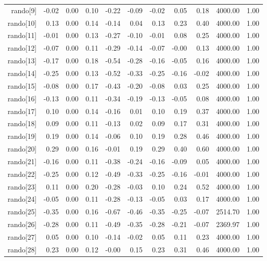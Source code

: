 \begin{table}[ht]
\begin{tabular}{rrrrrrrrrrr}
  rando[9] & -0.02 & 0.00 & 0.10 & -0.22 & -0.09 & -0.02 & 0.05 & 0.18 & 4000.00 & 1.00 \\ 
  rando[10] & 0.13 & 0.00 & 0.14 & -0.14 & 0.04 & 0.13 & 0.23 & 0.40 & 4000.00 & 1.00 \\ 
  rando[11] & -0.01 & 0.00 & 0.13 & -0.27 & -0.10 & -0.01 & 0.08 & 0.25 & 4000.00 & 1.00 \\ 
  rando[12] & -0.07 & 0.00 & 0.11 & -0.29 & -0.14 & -0.07 & -0.00 & 0.13 & 4000.00 & 1.00 \\ 
  rando[13] & -0.17 & 0.00 & 0.18 & -0.54 & -0.28 & -0.16 & -0.05 & 0.16 & 4000.00 & 1.00 \\ 
  rando[14] & -0.25 & 0.00 & 0.13 & -0.52 & -0.33 & -0.25 & -0.16 & -0.02 & 4000.00 & 1.00 \\ 
  rando[15] & -0.08 & 0.00 & 0.17 & -0.43 & -0.20 & -0.08 & 0.03 & 0.25 & 4000.00 & 1.00 \\ 
  rando[16] & -0.13 & 0.00 & 0.11 & -0.34 & -0.19 & -0.13 & -0.05 & 0.08 & 4000.00 & 1.00 \\ 
  rando[17] & 0.10 & 0.00 & 0.14 & -0.16 & 0.01 & 0.10 & 0.19 & 0.37 & 4000.00 & 1.00 \\ 
  rando[18] & 0.09 & 0.00 & 0.11 & -0.13 & 0.02 & 0.09 & 0.17 & 0.31 & 4000.00 & 1.00 \\ 
  rando[19] & 0.19 & 0.00 & 0.14 & -0.06 & 0.10 & 0.19 & 0.28 & 0.46 & 4000.00 & 1.00 \\ 
  rando[20] & 0.29 & 0.00 & 0.16 & -0.01 & 0.19 & 0.29 & 0.40 & 0.60 & 4000.00 & 1.00 \\ 
  rando[21] & -0.16 & 0.00 & 0.11 & -0.38 & -0.24 & -0.16 & -0.09 & 0.05 & 4000.00 & 1.00 \\ 
  rando[22] & -0.25 & 0.00 & 0.12 & -0.49 & -0.33 & -0.25 & -0.16 & -0.01 & 4000.00 & 1.00 \\ 
  rando[23] & 0.11 & 0.00 & 0.20 & -0.28 & -0.03 & 0.10 & 0.24 & 0.52 & 4000.00 & 1.00 \\ 
  rando[24] & -0.05 & 0.00 & 0.11 & -0.28 & -0.13 & -0.05 & 0.03 & 0.17 & 4000.00 & 1.00 \\ 
  rando[25] & -0.35 & 0.00 & 0.16 & -0.67 & -0.46 & -0.35 & -0.25 & -0.07 & 2514.70 & 1.00 \\ 
  rando[26] & -0.28 & 0.00 & 0.11 & -0.49 & -0.35 & -0.28 & -0.21 & -0.07 & 2369.97 & 1.00 \\ 
  rando[27] & 0.05 & 0.00 & 0.10 & -0.14 & -0.02 & 0.05 & 0.11 & 0.23 & 4000.00 & 1.00 \\ 
  rando[28] & 0.23 & 0.00 & 0.12 & -0.00 & 0.15 & 0.23 & 0.31 & 0.46 & 4000.00 & 1.00 \\ 

\end{tabular}
\end{table}

